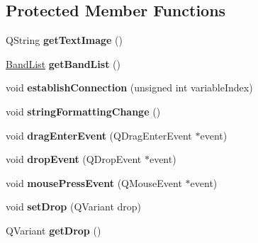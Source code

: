 \subsection*{Protected Member Functions}
\begin{DoxyCompactItemize}
\item 
\hypertarget{classQEAnalogProgressBar_ada710a11da3e3001a8d629e0f2d6b982}{
QString {\bfseries getTextImage} ()}
\label{classQEAnalogProgressBar_ada710a11da3e3001a8d629e0f2d6b982}

\item 
\hypertarget{classQEAnalogProgressBar_a85dae69adf4da0d9dccb7d5bdc8e963c}{
\hyperlink{classQEAnalogIndicator_1_1BandList}{BandList} {\bfseries getBandList} ()}
\label{classQEAnalogProgressBar_a85dae69adf4da0d9dccb7d5bdc8e963c}

\item 
\hypertarget{classQEAnalogProgressBar_a9c4b6069e610fe0af0492f817fd2671b}{
void {\bfseries establishConnection} (unsigned int variableIndex)}
\label{classQEAnalogProgressBar_a9c4b6069e610fe0af0492f817fd2671b}

\item 
\hypertarget{classQEAnalogProgressBar_a3a2176a5ebf6e5f9467b53c54ae9bd33}{
void {\bfseries stringFormattingChange} ()}
\label{classQEAnalogProgressBar_a3a2176a5ebf6e5f9467b53c54ae9bd33}

\item 
\hypertarget{classQEAnalogProgressBar_abe688e26b7e3ecc9cfa0e02cc7390510}{
void {\bfseries dragEnterEvent} (QDragEnterEvent $\ast$event)}
\label{classQEAnalogProgressBar_abe688e26b7e3ecc9cfa0e02cc7390510}

\item 
\hypertarget{classQEAnalogProgressBar_a7cc673f8f7056f3a86ee58fd4d671e18}{
void {\bfseries dropEvent} (QDropEvent $\ast$event)}
\label{classQEAnalogProgressBar_a7cc673f8f7056f3a86ee58fd4d671e18}

\item 
\hypertarget{classQEAnalogProgressBar_ae00f2dde8b0a99f5df0dadfbe2b62d1c}{
void {\bfseries mousePressEvent} (QMouseEvent $\ast$event)}
\label{classQEAnalogProgressBar_ae00f2dde8b0a99f5df0dadfbe2b62d1c}

\item 
\hypertarget{classQEAnalogProgressBar_a3114be2899e6dfa45ab5546fea6c9552}{
void {\bfseries setDrop} (QVariant drop)}
\label{classQEAnalogProgressBar_a3114be2899e6dfa45ab5546fea6c9552}

\item 
\hypertarget{classQEAnalogProgressBar_a7384b8fe3005c7fa02e3b00133dff1ca}{
QVariant {\bfseries getDrop} ()}
\label{classQEAnalogProgressBar_a7384b8fe3005c7fa02e3b00133dff1ca}


\end{DoxyCompactItemize}

